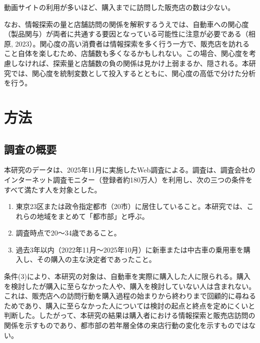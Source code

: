 \begin{description}[style=nextline,leftmargin=2\zw,labelsep=0.5\zw,font=\normalfont\bfseries,itemsep=2pt]
  \item[H4] 動画サイトの利用が多いほど、購入までに訪問した販売店の数は少ない。
\end{description}

なお、情報探索の量と店舗訪問の関係を解釈するうえでは、自動車への関心度（製品関与）が両者に共通する要因となっている可能性に注意が必要である（相原, 2023）。関心度の高い消費者は情報探索を多く行う一方で、販売店を訪れること自体を楽しむため、店舗数も多くなるかもしれない。この場合、関心度を考慮しなければ、探索量と店舗数の負の関係は見かけ上弱まるか、隠される。本研究では、関心度を統制変数として投入するとともに、関心度の高低で分けた分析を行う。

\clearpage
\section{方法}

\subsection{調査の概要}

本研究のデータは、2025年11月に実施したWeb調査による。調査は、調査会社のインターネット調査モニター（登録者約180万人）を利用し、次の三つの条件をすべて満たす人を対象とした。

\begin{enumerate}[label=(\arabic*),leftmargin=2.5\zw,itemsep=1pt]
  \item 東京23区または政令指定都市（20市）に居住していること。本研究では、これらの地域をまとめて「都市部」と呼ぶ。
  \item 調査時点で20〜34歳であること。
  \item 過去3年以内（2022年11月〜2025年10月）に新車または中古車の乗用車を購入し、その購入の主な決定者であったこと。
\end{enumerate}

条件(3)により、本研究の対象は、自動車を実際に購入した人に限られる。購入を検討したが購入に至らなかった人や、購入を検討していない人は含まれない。これは、販売店への訪問行動を購入過程の始まりから終わりまで回顧的に尋ねるためであり、購入に至らなかった人については検討の起点と終点を定めにくいと判断した。したがって、本研究の結果は購入者における情報探索と販売店訪問の関係を示すものであり、都市部の若年層全体の来店行動の変化を示すものではない。

